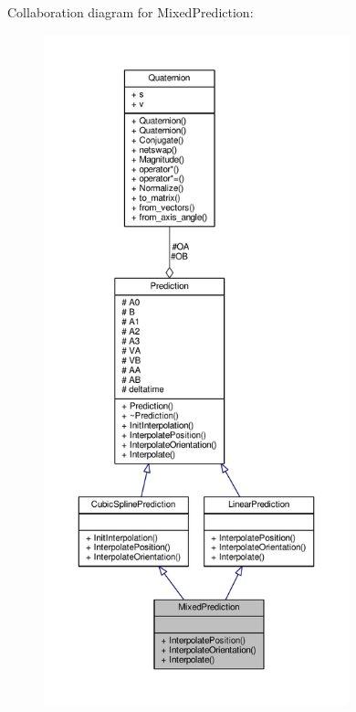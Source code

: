Collaboration diagram for Mixed\+Prediction\+:
\nopagebreak
\begin{figure}[H]
\begin{center}
\leavevmode
\includegraphics[height=550pt]{df/d5c/classMixedPrediction__coll__graph}
\end{center}
\end{figure}
